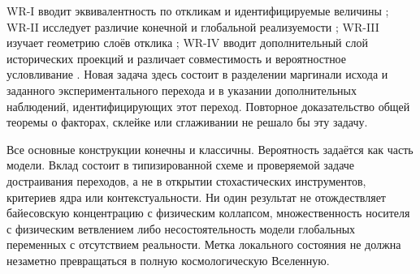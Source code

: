 {WR-I вводит эквивалентность по откликам и идентифицируемые величины \cite{WRI}; WR-II исследует различие конечной и глобальной реализуемости \cite{WRII}; WR-III изучает геометрию слоёв отклика \cite{WRIII}; WR-IV вводит дополнительный слой исторических проекций и различает совместимость и вероятностное условливание \cite{WRIV}. Новая задача здесь состоит в разделении маргинали исхода и заданного экспериментального перехода и в указании дополнительных наблюдений, идентифицирующих этот переход. Повторное доказательство общей теоремы о факторах, склейке или сглаживании не решало бы эту задачу.}

{Все основные конструкции конечны и классичны. Вероятность задаётся как часть модели. Вклад состоит в типизированной схеме и проверяемой задаче достраивания переходов, а не в открытии стохастических инструментов, критериев ядра или контекстуальности. Ни один результат не отождествляет байесовскую концентрацию с физическим коллапсом, множественность носителя с физическим ветвлением либо несостоятельность модели глобальных переменных с отсутствием реальности. Метка локального состояния не должна незаметно превращаться в полную космологическую Вселенную.}

